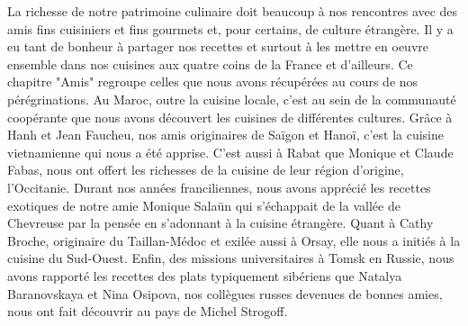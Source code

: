 La richesse de notre patrimoine culinaire doit beaucoup à nos rencontres avec des amis fins cuisiniers et fins gourmets et, pour certains, de culture étrangère. Il y a eu tant de bonheur à partager nos recettes et surtout à les mettre en oeuvre ensemble dans nos cuisines aux quatre coins de la France et d'ailleurs. Ce chapitre "Amis" regroupe celles que nous avons récupérées au cours de nos pérégrinations. Au Maroc, outre la cuisine locale, c'est au sein de la communauté coopérante que nous avons découvert les cuisines de différentes cultures. Grâce à Hanh et Jean Faucheu, nos amis originaires de Saïgon et Hanoï, c'est la cuisine vietnamienne qui nous a été apprise. C'est aussi à Rabat que Monique et Claude Fabas, nous ont offert les richesses de la cuisine de leur région d'origine, l'Occitanie. Durant nos années franciliennes, nous avons apprécié les recettes exotiques de notre amie Monique Salaün qui s'échappait de la vallée de Chevreuse par la pensée en s'adonnant à la cuisine étrangère. Quant à Cathy Broche, originaire du Taillan-Médoc et exilée aussi à Orsay, elle nous a initiés à la cuisine du Sud-Ouest. Enfin, des missions universitaires à Tomsk en Russie, nous avons rapporté les recettes des plats typiquement sibériens que Natalya Baranovskaya et Nina Osipova, nos collègues russes devenues de bonnes amies, nous ont fait découvrir au pays de Michel Strogoff.   
